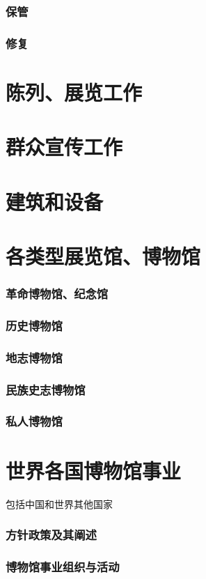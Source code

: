 \documentclass[UTF8]{../../ApplicationUniverse}
\begin{document}
    \subsubsection{保管}
    \subsubsection{修复}
\section{陈列、展览工作}
\section{群众宣传工作}
\section{建筑和设备}
\section{各类型展览馆、博物馆}
    \subsubsection{革命博物馆、纪念馆}
    \subsubsection{历史博物馆}
    \subsubsection{地志博物馆}
    \subsubsection{民族史志博物馆}
    \subsubsection{私人博物馆}


\section{世界各国博物馆事业}
包括中国和世界其他国家
\subsubsection{方针政策及其阐述}
\subsubsection{博物馆事业组织与活动}
\end{document}
